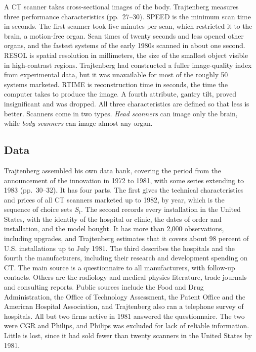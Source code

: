  A CT scanner takes cross-sectional images of the body. Trajtenberg measures three
performance characteristics (pp.~27--30). SPEED is the minimum scan time in seconds. The first scanner took five
minutes per scan, which restricted it to the brain, a motion-free organ. Scan times of twenty seconds and less
opened other organs, and the fastest systems of the early 1980s scanned in about one second. RESOL is spatial
resolution in millimeters, the size of the smallest object visible in high-contrast regions. Trajtenberg had
constructed a fuller image-quality index from experimental data, but it was unavailable for most of the roughly
50 systems marketed. RTIME is reconstruction time in seconds, the time the computer takes to produce the image. A
fourth attribute, gantry tilt, proved insignificant and was dropped. All three characteristics are defined so that
less is better. Scanners come in two types. \emph{Head scanners} can image only the brain, while \emph{body
scanners} can image almost any organ.

\subsection{Data}\label{sec:10-ct-data}

Trajtenberg assembled his own data bank, covering the period from the announcement of the innovation in 1972 to
1981, with some series extending to 1983 (pp.~30--32). It has four parts. The first gives the technical
characteristics and prices of all CT scanners marketed up to 1982, by year, which is the sequence of choice sets
$S_t$. The second records every installation in the United States, with the identity of the hospital or clinic,
the dates of order and installation, and the model bought. It has more than 2,000 observations, including
upgrades, and Trajtenberg estimates that it covers about 98 percent of U.S. installations up to July 1981. The
third describes the hospitals and the fourth the manufacturers, including their research and development spending
on CT. The main source is a questionnaire to all manufacturers, with follow-up contacts. Others are the radiology
and medical-physics literature, trade journals and consulting reports. Public sources include the Food and Drug
Administration, the Office of Technology Assessment, the Patent Office and the American Hospital Association, and
Trajtenberg also ran a telephone survey of hospitals.
All but two firms active in 1981 answered the questionnaire. The two were CGR and Philips, and Philips was excluded
for lack of reliable information. Little is lost, since it had sold fewer than twenty scanners in the United States by
1981.

